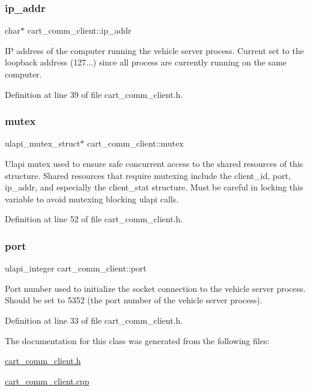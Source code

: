 \subsubsection{\texorpdfstring{ip\+\_\+addr}{ip\_addr}}
{\footnotesize\ttfamily char$\ast$ cart\+\_\+comm\+\_\+client\+::ip\+\_\+addr\hspace{0.3cm}{\ttfamily [private]}}

IP address of the computer running the vehicle server process. Current set to the loopback address (127...) since all process are currently running on the same computer. 

Definition at line 39 of file cart\+\_\+comm\+\_\+client.\+h.

\mbox{\label{classcart__comm__client_a7829aa94a950b37a2d003f11761e269d}} 
\subsubsection{\texorpdfstring{mutex}{mutex}}
{\footnotesize\ttfamily ulapi\+\_\+mutex\+\_\+struct$\ast$ cart\+\_\+comm\+\_\+client\+::mutex\hspace{0.3cm}{\ttfamily [private]}}

Ulapi mutex used to ensure safe concurrent access to the shared resources of this structure. Shared resources that require mutexing include the client\+\_\+id, port, ip\+\_\+addr, and especially the client\+\_\+stat structure. Must be careful in locking this variable to avoid mutexing blocking ulapi calls. 

Definition at line 52 of file cart\+\_\+comm\+\_\+client.\+h.

\mbox{\label{classcart__comm__client_ab7aaa2b3805ad44d18c97a094ef705d3}} 
\subsubsection{\texorpdfstring{port}{port}}
{\footnotesize\ttfamily ulapi\+\_\+integer cart\+\_\+comm\+\_\+client\+::port\hspace{0.3cm}{\ttfamily [private]}}

Port number used to initialize the socket connection to the vehicle server process. Should be set to 5352 (the port number of the vehicle server process). 

Definition at line 33 of file cart\+\_\+comm\+\_\+client.\+h.



The documentation for this class was generated from the following files\+:\begin{DoxyCompactItemize}
\item 
\mbox{\hyperlink{cart__comm__client_8h}{cart\+\_\+comm\+\_\+client.\+h}}\item 
\mbox{\hyperlink{cart__comm__client_8cpp}{cart\+\_\+comm\+\_\+client.\+cpp}}\end{DoxyCompactItemize}
